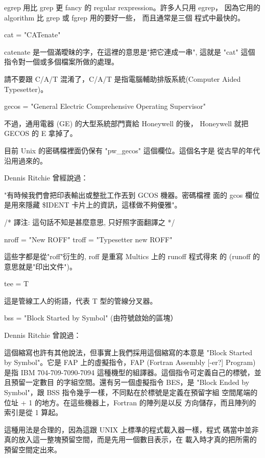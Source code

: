 \documentclass{letter}
\begin{document}
\begin{CJK}{Bg5}{ming}
	egrep 用比 grep 更 fancy 的 regular rexpression。許多人只用 egrep，
        因為它用的 algorithm 比 grep 或 fgrep 用的要好一些， 而且通常是三個
        程式中最快的。

    cat = "CATenate"

	catenate 是一個滿曖昧的字，在這裡的意思是"把它連成一串", 這就是
	"cat" 這個指令對一個或多個檔案所做的處理。

	請不要跟 C/A/T 混淆了，C/A/T 是指電腦輔助排版系統(Computer 
	Aided Typesetter)。

    gecos = "General Electric Comprehensive Operating Supervisor"

	不過，通用電器 (GE) 的大型系統部門賣給 Honeywell 的後， 
        Honeywell 就把 GECOS 的 E 拿掉了。

	目前 Unix 的密碼檔裡面仍保有 "pw\_gecos" 這個欄位。這個名字是
	從古早的年代沿用過來的。

	Dennis Ritchie 曾經說過：

	    "有時候我們會把印表輸出或整批工作丟到 GCOS 機器。密碼檔裡
            面的 gcos 欄位是用來隱藏 \$IDENT 卡片上的資訊，這樣做不夠優雅"。

	    /* 
             譯注: 這句話不知是甚麼意思, 只好照字面翻譯之
	    */

    nroff = "New ROFF"
    troff = "Typesetter new ROFF"

	這些字都是從"roff"衍生的, roff 是重寫 Multics 上的 runoff 程式得來
	的 (runoff 的意思就是"印出文件")。

    tee = T

	這是管線工人的術語，代表 T 型的管線分叉器。

    bss = "Block Started by Symbol" (由符號啟始的區塊）

	Dennis  Ritchie 曾說過：

	    這個縮寫也許有其他說法，但事實上我們採用這個縮寫的本意是 
            "Block Started by Symbol"。它是 FAP 上的虛擬指令，FAP 
            (Fortran Assembly [-er?] Program) 是指 IBM 704-709-7090-7094 
	    這種機型的組譯器。這個指令可定義自己的標號，並且預留一定數目
	    的字組空間。還有另一個虛擬指令 BES，是 "Block Ended by 
   	    Symbol"，跟 BSS 指令幾乎一樣，不同點在於標號是定義在預留字組
	    空間尾端的位址 + 1 的地方。在這些機器上，Fortran 的陣列是以反
	    方向儲存，而且陣列的索引是從 1 算起。

	    這種用法是合理的，因為這跟 UNIX 上標準的程式載入器一樣，程式
	    碼當中並非真的放入這一整塊預留空間，而是先用一個數目表示，在
	    載入時才真的把所需的預留空間定出來。


\end{CJK}
\end{document}

